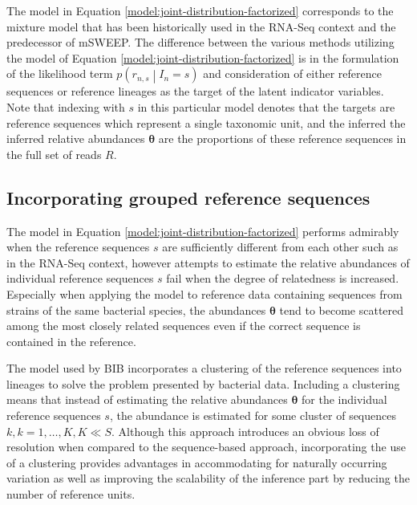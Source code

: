 \documentclass[officiallayout]{tktla}
\begin{document}
The model in Equation \ref{model:joint-distribution-factorized}
corresponds to the mixture model that has been historically used in
the RNA-Seq context and the predecessor of mSWEEP. The difference
between the various methods utilizing the model of Equation
\ref{model:joint-distribution-factorized} is in the formulation of the
likelihood term $p\left(r_{n, s} \middle| I_{n} = s\right)$ and
consideration of either reference sequences or reference lineages as
the target of the latent indicator variables. Note that indexing with
$s$ in this particular model denotes that the targets are reference
sequences which represent a single taxonomic unit, and the inferred
the inferred relative abundances $\boldsymbol\theta$ are the
proportions of these reference sequences in the full set of reads $R$.

\subsection{Incorporating grouped reference sequences}

The model in Equation \ref{model:joint-distribution-factorized}
performs admirably when the reference sequences $s$ are sufficiently
different from each other such as in the RNA-Seq context, however
attempts to estimate the relative abundances of individual reference
sequences $s$ fail when the degree of relatedness is
increased. Especially when applying the model to reference data
containing sequences from strains of the same bacterial species, the
abundances $\boldsymbol\theta$ tend to become scattered among the most
closely related sequences \textemdash{ } even if the correct sequence
is contained in the reference.

The model used by BIB incorporates a clustering of the reference
sequences into lineages to solve the problem presented by bacterial
data. Including a clustering means that instead of estimating the
relative abundances $\boldsymbol\theta$ for the individual reference
sequences $s$, the abundance is estimated for some cluster of
sequences $k, k = 1, \dots, K, K \ll S$. Although this approach
introduces an obvious loss of resolution when compared to the
sequence-based approach, incorporating the use of a clustering
provides advantages in accommodating for naturally occurring variation
as well as improving the scalability of the inference part by reducing
the number of reference units.
\end{document}
